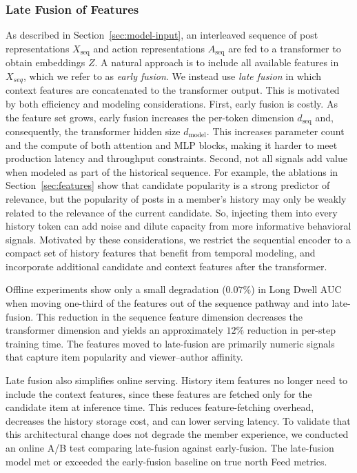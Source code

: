 \documentclass[sigconf]{acmart}
\begin{document}
\subsubsection{Late Fusion of Features}\label{sec:late-fusion}
As described in Section~\ref{sec:model-input}, an interleaved sequence of post representations $X_{\text{seq}}$ and action representations $A_{\text{seq}}$ are fed to a transformer to obtain embeddings $Z$. A natural approach is to include all available features in $X_{seq}$, which we refer to as \emph{early fusion}. We instead use \emph{late fusion} in which context features are concatenated to the transformer output. This is motivated by both efficiency and modeling considerations. First, early fusion is costly. As the feature set grows, early fusion increases the per-token dimension $d_{\text{seq}}$ and, consequently, the transformer hidden size $d_{\text{model}}$. This increases parameter count and the compute of both attention and MLP blocks, making it harder to meet production latency and throughput constraints. Second, not all signals add value when modeled as part of the historical sequence. For example, the ablations in Section~\ref{sec:features} show that candidate popularity is a strong predictor of relevance, but the popularity of posts in a member's history may only be weakly related to the relevance of the current candidate. So, injecting them into every history token can add noise and dilute capacity from more informative behavioral signals. Motivated by these considerations, we restrict the sequential encoder to a compact set of history features that benefit from temporal modeling, and incorporate additional candidate and context features after the transformer.

Offline experiments show only a small degradation ($0.07\%$) in Long Dwell AUC when moving one-third of the features out of the sequence pathway and into late-fusion. This reduction in the sequence feature dimension decreases the transformer dimension and yields an approximately $12\%$ reduction in per-step training time. The features moved to late-fusion are primarily numeric signals that capture item popularity and viewer--author affinity.

Late fusion also simplifies online serving. History item features no longer need to include the context features, since these features are fetched only for the candidate item at inference time. This reduces feature-fetching overhead, decreases the history storage cost, and can lower serving latency. To validate that this architectural change does not degrade the member experience, we conducted an online A/B test comparing late-fusion against early-fusion. The late-fusion model met or exceeded the early-fusion baseline on true north Feed metrics. 
\end{document}
